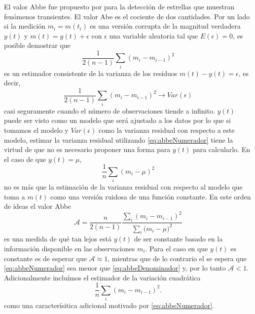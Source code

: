 \documentclass[letterpaper,12pt]{book}
\begin{document}
El valor Abbe fue propuesto por \cite{mowlavi_searching_2014} para la detección de estrellas que muestran fenómenos transientes. El valor Abe es el cociente de dos cantidades. Por un lado si la medición $m_i=m(t_i)$ es una versión corrupta de la magnitud verdadera $y(t)$ y $m(t) = y(t)+\epsilon$ con $\epsilon$ una variable aleatoria tal que $E(\epsilon)=0$, es posible demostrar que 
\begin{equation}
    \frac{1}{2(n-1)}\sum_i\left(m_i-m_{i-1}\right)^2
\end{equation}
es un estimador consistente de la varianza de los residuos $m(t)-y(t)=\epsilon$, es decir,
\begin{equation}\label{eq:abbeNumerador}
\frac{1}{2(n-1)}\sum_i\left(m_i-m_{i-1}\right)^2\to Var(\epsilon)
\end{equation} 
casi seguramente cuando el número de observaciones tiende a infinito. $y(t)$ puede ser visto como un modelo que será ajustado a los datos por lo que si tomamos el modelo  y $Var(\epsilon)$ como la varianza residual con respecto a este modelo,  estimar la varianza residual utilizando \ref{eq:abbeNumerador} tiene la virtud de que no es necesario proponer una forma para $y(t)$ para calcularlo. En el caso de que $y(t)=\mu$, 
\begin{equation}
\frac{1}{n}\sum_i\left(m_i-\mu\right)^2
\end{equation} 
no es más que la estimación de la varianza residual con respecto al modelo que toma a $m(t)$ como una versión ruidosa de una función constante. En este orden de ideas el valor Abbe
\begin{equation}\label{eq:abbeDenominador}
\mathcal{A}=\frac{n}{2(n-1)}\frac{\sum_{i}{(m_{i}-m_{i-1})^{2}}}{\sum_{i}{(m_{i}-\mu})^2}
\end{equation}
es una medida de qué tan lejos está $y(t)$ de ser constante basado en la información disponible en las observaciones $m_i$. Para el caso en que $y(t)$ es constante es de esperar que $\mathcal{A}\approx 1$, mientras que de lo contrario el se espera que \ref{eq:abbeNumerador} sea menor que \ref{eq:abbeDenominador} y, por lo tanto $\mathcal{A}<1$. Adicionalmente incluímos el estimador de la variación cuadrática
\begin{equation}\label{eq:abbeDenominador}
\frac{1}{n}\sum_{i}{(m_{i}-m_{i-1})^{2}}.
\end{equation} 
como una caracterísitica adicional motivado por \ref{eq:abbeNumerador}.
\end{document}
